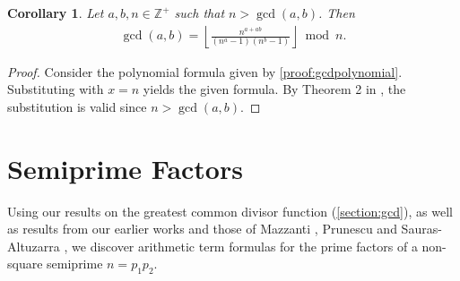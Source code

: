 \documentclass[11pt,reqno]{article}
\theoremstyle{plain}
\newtheorem{corollary}[theorem]{Corollary}
\theoremstyle{definition}
\newcommand{\floor}[1]{\left\lfloor #1 \right\rfloor}
\newcommand{\Z}{\mathbb{Z}}
\begin{document}
\begin{corollary} \label{proof:gcdintegerbase}
Let $a,b,n \in \Z^+$ such that $n > \gcd(a,b)$. Then
\begin{align*}
\gcd(a,b) = \floor{\frac{n^{a+ab}}{(n^a-1)(n^b-1)}}\bmod n .
\end{align*}
\end{corollary}
\begin{proof}
Consider the polynomial formula given by \cref{proof:gcdpolynomial}. Substituting with $x = n$ yields the given formula. By Theorem 2 in  \cite{shunia2024polynomial}, the substitution is valid since $n > \gcd(a,b)$.
\end{proof}

\section{Semiprime Factors} \label{section:semiprimes}
Using our results on the greatest common divisor function (\cref{section:gcd}), as well as results from our earlier works \cite{shunia2023simple,shunia2024polynomial} and those of Mazzanti \cite{mazzanti2002plainbases}, Prunescu and Sauras-Altuzarra \cite{prunescu2024factorial}, we discover arithmetic term formulas for the prime factors of a non-square semiprime $n=p_1 p_2$.
\end{document}
